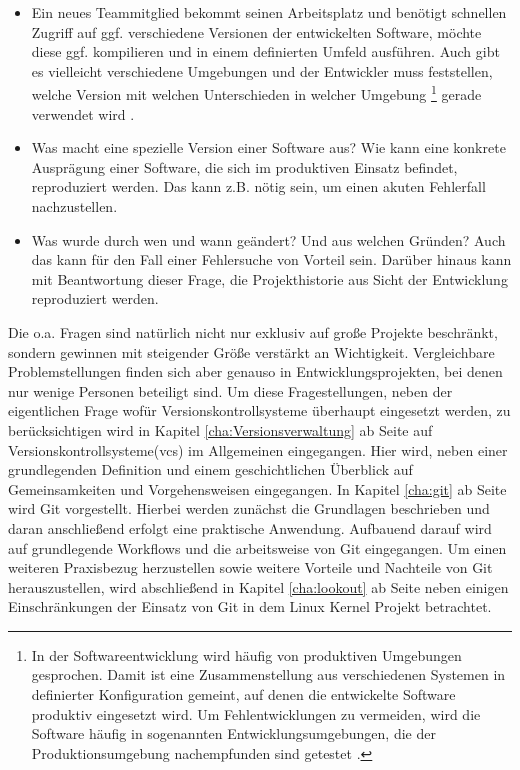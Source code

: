 \begin{itemize}
  \item Ein neues Teammitglied bekommt seinen Arbeitsplatz und ben\"otigt
  schnellen Zugriff auf ggf. verschiedene Versionen der entwickelten Software,
  m\"ochte diese ggf. kompilieren und in einem definierten Umfeld ausf\"uhren.
  Auch gibt es vielleicht verschiedene Umgebungen und der Entwickler muss
  feststellen, welche Version mit welchen Unterschieden in welcher \gls{Umgebung}
  \footnote{\label{umgebung:1}In der Softwareentwicklung wird häufig von
  produktiven Umgebungen gesprochen. Damit ist eine Zusammenstellung aus
  verschiedenen Systemen in definierter Konfiguration gemeint, auf denen die
  entwickelte Software produktiv eingesetzt wird. Um Fehlentwicklungen zu
  vermeiden, wird die Software häufig in sogenannten Entwicklungsumgebungen,
  die der Produktionsumgebung nachempfunden sind getestet \cite[S.~49,
  250]{cd}.} gerade verwendet wird \citep[S.~26]{cd}.
  \item Was macht eine spezielle Version einer Software aus?  Wie kann eine
  konkrete Auspr\"agung einer Software, die sich im produktiven Einsatz
  befindet, reproduziert werden. Das kann z.B. n\"otig sein, um einen akuten
  Fehlerfall nachzustellen\cite[s.~33]{cd}.
  \item Was wurde durch wen und wann ge\"andert? Und aus welchen Gr\"unden?
  Auch das kann f\"ur den Fall einer Fehlersuche von Vorteil sein. Darüber
  hinaus kann mit Beantwortung dieser Frage, die Projekthistorie aus Sicht der
  Entwicklung reproduziert werden\cite[S.~33]{cd}.
\end{itemize}
Die o.a. Fragen sind natürlich nicht nur exklusiv auf große Projekte
beschränkt, sondern gewinnen mit steigender Größe verstärkt an Wichtigkeit.
Vergleichbare Problemstellungen finden sich aber genauso in
Entwicklungsprojekten, bei denen nur wenige Personen beteiligt sind. Um diese
Fragestellungen, neben der eigentlichen Frage wofür Versionskontrollsysteme
überhaupt eingesetzt werden, zu berücksichtigen wird in Kapitel
\ref{cha:Versionsverwaltung} ab Seite \pageref{cha:Versionsverwaltung} auf
Versionskontrollsysteme(\acrshort{vcs}) im Allgemeinen eingegangen. Hier wird,
neben einer grundlegenden Definition und einem geschichtlichen Überblick auf
Gemeinsamkeiten und Vorgehensweisen eingegangen. In Kapitel \ref{cha:git} ab
Seite \pageref{cha:git} wird Git vorgestellt. Hierbei werden zunächst die
Grundlagen beschrieben und daran anschließend erfolgt eine praktische
Anwendung. Aufbauend darauf wird auf grundlegende Workflows und die
arbeitsweise von Git eingegangen. Um einen weiteren Praxisbezug herzustellen
sowie weitere Vorteile und Nachteile von Git herauszustellen, wird abschließend
in Kapitel \ref{cha:lookout} ab Seite \pageref{cha:lookout} neben einigen
Einschränkungen der Einsatz von Git in dem Linux Kernel Projekt betrachtet.
